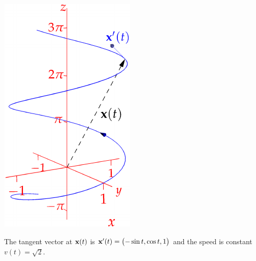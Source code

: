 \begin{tcolorbox}[exstyle,title={}]
\begin{description}
\begin{minipage}[t]{0.72\linewidth}
		\end{minipage}
		\hfill
		\begin{minipage}[t]{0.27\linewidth}\vspace{0pt}
			\flushright	\href{http://www.math.uci.edu/~ndonalds/math162a/curves-helixnew.html}{\includegraphics{curves-helixnew}}
		\end{minipage}\par
		The tangent vector at ${\mathbf{x}}(t)$ is ${\mathbf{x}}'(t)=\bigl(-\sin t,\cos t,1\bigr)$ and the speed is constant $v(t)=\sqrt 2$.
	

\end{description}
\end{tcolorbox}

